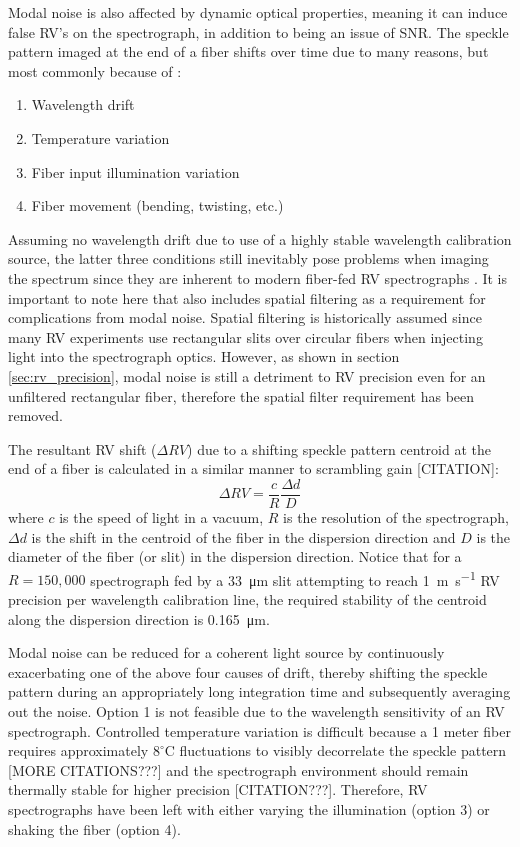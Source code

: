 \documentclass[twocolumn]{emulateapj}
\begin{document}
Modal noise is also affected by dynamic optical properties, meaning it can induce false RV's on the spectrograph, in addition to being an issue of SNR. The speckle pattern imaged at the end of a fiber shifts over time due to many reasons, but most commonly because of \citep{Epworth1978}:
\begin{enumerate}
\item Wavelength drift
\item Temperature variation
\item Fiber input illumination variation
\item Fiber movement (bending, twisting, etc.)
\end{enumerate}
Assuming no wavelength drift due to use of a highly stable wavelength calibration source, the latter three conditions still inevitably pose problems when imaging the spectrum since they are inherent to modern fiber-fed RV spectrographs \citep{Baudrand2001, Mahadevan2014}. It is important to note here that \cite{Epworth1978} also includes spatial filtering as a requirement for complications from modal noise. Spatial filtering is historically assumed since many RV experiments use rectangular slits over circular fibers when injecting light into the spectrograph optics. However, as shown in section \ref{sec:rv_precision}, modal noise is still a detriment to RV precision even for an unfiltered rectangular fiber, therefore the spatial filter requirement has been removed.

The resultant RV shift ($\Delta RV$) due to a shifting speckle pattern centroid at the end of a fiber is calculated in a similar manner to scrambling gain [CITATION]:
\begin{equation}
\Delta RV = \frac{c}{R} \frac{\Delta d}{D}
\label{eq:rv_error}
\end{equation}
where $c$ is the speed of light in a vacuum, $R$ is the resolution of the spectrograph, $\Delta d$ is the shift in the centroid of the fiber in the dispersion direction and $D$ is the diameter of the fiber (or slit) in the dispersion direction. Notice that for a $R=150,000$ spectrograph fed by a \SI{33}{\micro\meter} slit attempting to reach \SI{1}{\meter\per\second} RV precision per wavelength calibration line, the required stability of the centroid along the dispersion direction is \SI{0.165}{\micro\meter}.

Modal noise can be reduced for a coherent light source by continuously exacerbating one of the above four causes of drift, thereby shifting the speckle pattern during an appropriately long integration time and subsequently averaging out the noise. Option 1 is not feasible due to the wavelength sensitivity of an RV spectrograph. Controlled temperature variation is difficult because a 1 meter fiber requires approximately $8 ^\circ \textrm{C}$ fluctuations to visibly decorrelate the speckle pattern \citep{Redding2013} [MORE CITATIONS???] and the spectrograph environment should remain thermally stable for higher precision [CITATION???]. Therefore, RV spectrographs have been left with either varying the illumination (option 3) or shaking the fiber (option 4).
\end{document}
